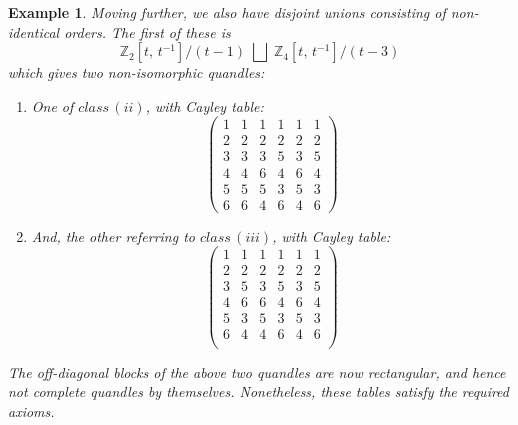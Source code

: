 \documentclass[a4paper,12pt]{article}
\newtheorem{example}{Example}[section]
\begin{document}
\begin{example}
Moving further, we also have disjoint unions consisting of non-identical orders.  The first of these is  
$$\mathbb{Z}_2  [t, \, t^{-1}]   / (t-1) \;  \bigsqcup  \; \mathbb{Z}_4  [t, \, t^{-1}]   / (t-3)$$   
which gives two non-isomorphic quandles: 
\begin{enumerate}
    \item   One of $class \, (ii)$, with Cayley table:   
   $$  \left(  \begin{array}{cccccc}  
 1 & 1 & 1 & 1 & 1 & 1 \\
 2 & 2 & 2 & 2 & 2 & 2 \\
 3 & 3 & 3 & 5 & 3 & 5 \\
 4 & 4 & 6 & 4 & 6 & 4 \\
 5 & 5 & 5 & 3 & 5 & 3 \\
 6 & 6 & 4 & 6 & 4 & 6
\end{array}  \right)    $$

\item And, the other referring to $class \, (iii)$, with Cayley table:   
   $$  \left(  \begin{array}{cccccc} 
 1 & 1 & 1 & 1 & 1 & 1 \\
 2 & 2 & 2 & 2 & 2 & 2 \\
 3 & 5 & 3 & 5 & 3 & 5 \\
 4 & 6 & 6 & 4 & 6 & 4 \\
 5 & 3 & 5 & 3 & 5 & 3 \\
 6 & 4 & 4 & 6 & 4 & 6  \\
\end{array}  \right)    $$

\end{enumerate}  
The off-diagonal blocks of the above two quandles are now rectangular, and hence not complete quandles by themselves. Nonetheless, these tables  satisfy the required axioms. 

\end{example}
\end{document}
